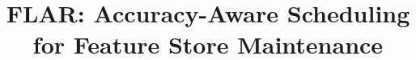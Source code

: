 \documentclass[sigconf, nonacm]{acmart}
\newcommand{\system}{FLAR}
\begin{document}
\title{\system{}: Accuracy-Aware Scheduling for Feature Store Maintenance}










\maketitle
\end{document}
